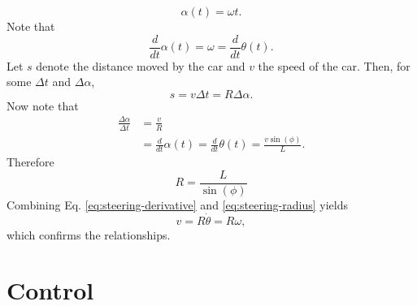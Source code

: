 \documentclass[11pt,titlepage]{report}
\begin{document}
\[
	\alpha(t) = \omega t.
\]
Note that
\[
	\frac{d}{dt} \alpha(t) = \omega = \frac{d}{dt} \theta(t).
\]
Let $s$ denote the distance moved by the car and $v$ the speed of the car. Then, for some $\Delta t$ and $\Delta \alpha$,
\[
	s = v \Delta t = R \Delta \alpha.
\]
Now note that
\begin{align*}
	\frac{\Delta \alpha}{\Delta t} &= \frac{v}{R} \\
	&=\frac{d}{dt} \alpha(t)=\frac{d}{dt} \theta(t) = \frac{v \sin{(\phi)}}{L}.
\end{align*}
Therefore
\begin{equation} \label{eq:steering-radius}
	R = \frac{L}{\sin{(\phi)}}
\end{equation}
Combining Eq. \ref{eq:steering-derivative} and \ref{eq:steering-radius} yields
\[
	v=R \dot{\theta}=R \omega,
\]
which confirms the relationships.

\section*{Control}
\end{document}
